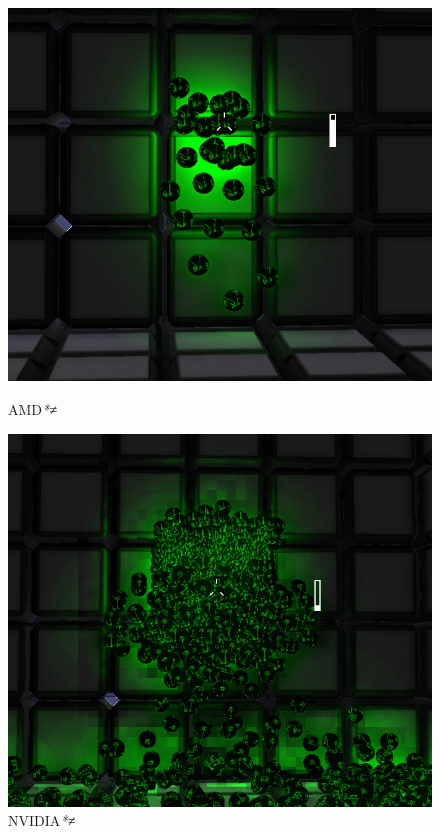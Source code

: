 \begin{frame}
\begin{figure}[ht]
  \begin{minipage}[b]{0.3\linewidth}
    \centering
    \includegraphics[width=1.0\textwidth]{img/tbds.png}
    \caption{AMD\textit{*≠}}
  \end{minipage}
  \hspace{0.25cm}
  \begin{minipage}[b]{0.3\linewidth}
    \centering
    \includegraphics[width=1.0\textwidth]{img/tbds_error.png}
    \caption{NVIDIA\textit{*≠}}
  \end{minipage}
  \label{fig:tilingerror}
\end{figure}

\end{frame}

